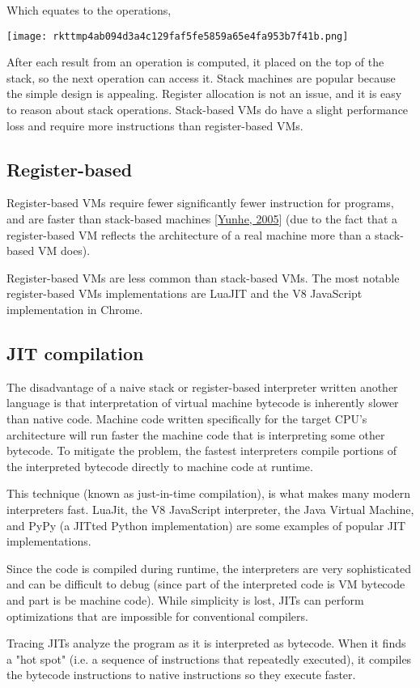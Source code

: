 \documentclass{book}
\newcommand{\Ssubsubsection}[2]{\subsubsection[#1]{#2}}
\renewcommand{\Ssubsubsection}[2]{\subsection[#1]{#2}}
\begin{document}
Which equates to the operations,

\texttt{[image: rkttmp4ab094d3a4c129faf5fe5859a65e4fa953b7f41b.png]}

After each result from an operation is computed, it placed on the top of
the stack, so the next operation can access it. Stack machines are popular
because the simple design is appealing. Register allocation is not an
issue, and it is easy to reason about stack operations. Stack{-}based VMs do
have a slight performance loss and require more instructions than
register{-}based VMs.

\Ssubsubsection{Register{-}based}{Register{-}based}\label{t:x28part_x22Registerx2dbasedx22x29}

Register{-}based VMs require fewer significantly fewer instruction for
programs, and are faster than stack{-}based machines [\hyperref[t:x28cite_x22Yunhex2c_2005x22x29]{Yunhe, 2005}] (due
to the fact that a register{-}based VM reflects the architecture of a real
machine more than a stack{-}based VM does).

Register{-}based VMs are less common than stack{-}based VMs. The most notable
register{-}based VMs implementations are LuaJIT and the V8 JavaScript
implementation in Chrome.

\Ssubsubsection{JIT compilation}{JIT compilation}\label{t:x28part_x22JITx5fcompilationx22x29}

The disadvantage of a naive stack or register{-}based interpreter written
another language is that interpretation of virtual machine bytecode is
inherently slower than native code. Machine code written specifically for
the target CPU{'}s architecture will run faster the machine code that is
interpreting some other bytecode. To mitigate the problem, the fastest
interpreters compile portions of the interpreted bytecode directly to
machine code at runtime.

This technique (known as just{-}in{-}time compilation), is what makes many modern
interpreters fast. LuaJit, the V8 JavaScript interpreter, the Java Virtual Machine,
and PyPy (a JITted Python implementation) are some examples of popular
JIT implementations.

Since the code is compiled during runtime, the interpreters are very
sophisticated and can be difficult to debug (since part of the interpreted
code is VM bytecode and part is be machine code). While simplicity is
lost, JITs can perform optimizations that are impossible for conventional
compilers.

Tracing JITs analyze the program as it is interpreted as bytecode. When it
finds a "hot spot" (i.e. a sequence of instructions that repeatedly
executed), it compiles the bytecode instructions to native instructions so
they execute faster.
\end{document}
